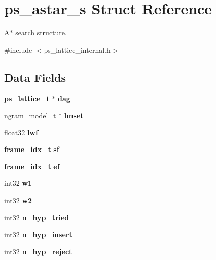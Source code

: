 \section{ps\-\_\-astar\-\_\-s Struct Reference}
\label{structps__astar__s}


A$\ast$ search structure.  




{\ttfamily \#include $<$ps\-\_\-lattice\-\_\-internal.\-h$>$}

\subsection*{Data Fields}
\begin{DoxyCompactItemize}
\item 
{\bf ps\-\_\-lattice\-\_\-t} $\ast$ {\bfseries dag}\label{structps__astar__s_a3c6c2135760c306452e7f5b995091576}

\item 
ngram\-\_\-model\-\_\-t $\ast$ {\bfseries lmset}\label{structps__astar__s_a5b7f214f56369c27753e66046fc8ef5c}

\item 
float32 {\bfseries lwf}\label{structps__astar__s_a9b1624982f8e671404581ac8b372a445}

\item 
{\bf frame\-\_\-idx\-\_\-t} {\bfseries sf}\label{structps__astar__s_a89a18074075a7793803b242bbe8a3028}

\item 
{\bf frame\-\_\-idx\-\_\-t} {\bfseries ef}\label{structps__astar__s_aa2104e1a0a3b369582b5fa920ffa51e6}

\item 
int32 {\bfseries w1}\label{structps__astar__s_ad1ada6d9fe189e9f7c028ade731967b2}

\item 
int32 {\bfseries w2}\label{structps__astar__s_aa3fcb0733516a2740086969c4b4c88e4}

\item 
int32 {\bfseries n\-\_\-hyp\-\_\-tried}\label{structps__astar__s_ad8eb709a4df4d04112578b3cb390e1c5}

\item 
int32 {\bfseries n\-\_\-hyp\-\_\-insert}\label{structps__astar__s_abd46619036fe6ff13ca9d2ca5b76512b}

\item 
int32 {\bfseries n\-\_\-hyp\-\_\-reject}\label{structps__astar__s_a3de51b20d960b50aec4d908af5e43787}


\end{DoxyCompactItemize}
